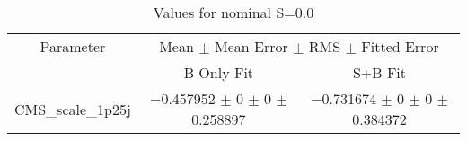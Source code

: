 \begin{table}
\centering
\caption{Values for nominal S=0.0}
\begin{tabular}{ccc}
\toprule
Parameter & \multicolumn{2}{c}{Mean $\pm$ Mean Error $\pm$ RMS $\pm$ Fitted Error}\\
 & B-Only Fit & S+B Fit\\
\midrule
CMS\_scale\_1p25j & \num{-0.457952} $\pm$ \num{0} $\pm$ \num{0} $\pm$ \num{0.258897} & \num{-0.731674} $\pm$ \num{0} $\pm$ \num{0} $\pm$ \num{0.384372}\\
\bottomrule
\end{tabular}
\end{table}